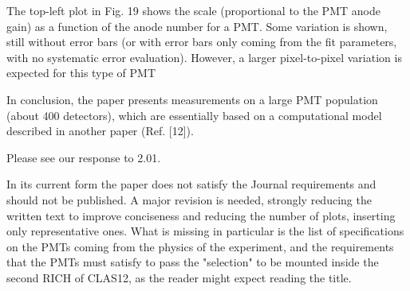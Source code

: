 \documentclass[11pt]{report}
\begin{document}
\begin{tcolorbox}[enlarge top by=2em,colbacktitle=black!60!white,colframe=black!80!white,left=0pt,right=0pt,top=0pt,bottom=0pt,boxrule=0.3pt,title=\bfseries2.09b]
The top-left plot in Fig. 19 shows the scale (proportional to the PMT anode gain) as a function of the anode number for a PMT. Some variation is shown, still without error bars (or with error bars only coming from the fit parameters, with no systematic error evaluation). However, a larger pixel-to-pixel variation is expected for this type of PMT
\end{tcolorbox}






\begin{tcolorbox}[enlarge top by=2em,colbacktitle=black!60!white,colframe=black!80!white,left=0pt,right=0pt,top=0pt,bottom=0pt,boxrule=0.3pt,title=\bfseries2.10]
In conclusion, the paper presents measurements on a large PMT population (about 400 detectors), which are essentially based on a computational model described in another paper (Ref. [12]).
\end{tcolorbox}

Please see our response to 2.01.


\begin{tcolorbox}[enlarge top by=2em,colbacktitle=black!60!white,colframe=black!80!white,left=0pt,right=0pt,top=0pt,bottom=0pt,boxrule=0.3pt,title=\bfseries2.11]
In its current form the paper does not satisfy the Journal requirements and should not be published. A major revision is needed, strongly reducing the written text to improve conciseness and reducing the number of plots, inserting only representative ones. What is missing in particular is the list of specifications on the PMTs coming from the physics of the experiment, and the requirements that the PMTs must satisfy to pass the "selection" to be mounted inside the second RICH of CLAS12, as the reader might expect reading the title.
\end{tcolorbox}
\end{document}
